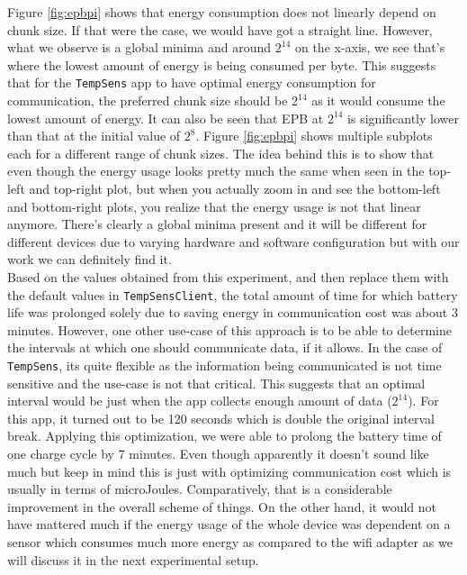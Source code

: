Figure \ref{fig:epbpi} shows that energy consumption does not linearly depend on chunk size. If that were the case, 
we would have got a straight line. However, what we observe is a global minima and around \texttt{$2^{14}$} on 
the x-axis, we see that's where the lowest amount of energy is being consumed per byte. This suggests that 
for the \texttt{TempSens} app to have optimal energy consumption for communication, the preferred chunk size 
should be \texttt{$2^{14}$} as it would consume the lowest amount of energy. It can also be seen that EPB at \texttt{$2^{14}$} 
is significantly lower than that at the initial value of \texttt{$2^{8}$}. Figure \ref{fig:epbpi} shows multiple 
subplots each for a different range of chunk sizes. The idea behind this is to show that even though the energy 
usage looks pretty much the same when seen in the top-left and top-right plot, but when you actually zoom in 
and see the bottom-left and bottom-right plots, you realize that the energy usage is not that linear anymore. 
There's clearly a global minima present and it will be different for different devices due to varying 
hardware and software configuration but with our work we can definitely find it. \\
Based on the values obtained from this experiment, and then replace them with the default values in \texttt{TempSensClient}, 
the total amount of time for which battery life was prolonged solely due to saving energy in communication cost 
was about 3 minutes. However, one other use-case of this approach is to be able to determine the intervals at 
which one should communicate data, if it allows. In the case of \texttt{TempSens}, its quite flexible as 
the information being communicated is not time sensitive and the use-case is not that critical. This suggests that 
an optimal interval would be just when the app collects enough amount of data (\texttt{$2^{14}$}). For this app, 
it turned out to be 120 seconds which is double the original interval break. Applying this optimization, we were 
able to prolong the battery time of one charge cycle by 7 minutes. Even though apparently it doesn't sound like much 
but keep in mind this is just with optimizing communication cost which is usually in terms of microJoules. 
Comparatively, that is a considerable improvement in the overall scheme of things. On the other hand, it would 
not have mattered much if the energy usage of the whole device was dependent on a sensor which consumes 
much more energy as compared to the wifi adapter as we will discuss it in the next experimental setup. \\

